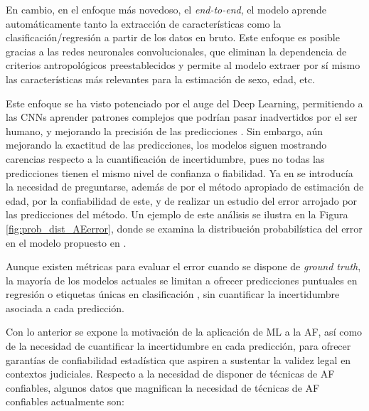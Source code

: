 En cambio, en el enfoque más novedoso, el \textit{end-to-end}, el modelo aprende automáticamente 
tanto la extracción de características como la clasificación/regresión a partir de los datos en bruto. Este enfoque 
es posible gracias a las redes neuronales convolucionales, que eliminan la dependencia de criterios 
antropológicos preestablecidos y permite al modelo extraer por sí mismo las características más relevantes para la
estimación de sexo, edad, etc. 

Este enfoque se ha visto potenciado por el auge del Deep Learning, permitiendo a las CNNs aprender patrones complejos 
que podrían pasar inadvertidos por el ser humano, y mejorando la precisión de las predicciones \cite{stern2019, venema2022}. 
Sin embargo, aún mejorando la exactitud de las predicciones, los modelos siguen mostrando carencias respecto a la 
cuantificación de incertidumbre, pues no todas las predicciones tienen el mismo nivel de confianza o fiabilidad.
Ya en \cite{ferrante2009} se introducía la necesidad de preguntarse, además de por el método apropiado de estimación 
de edad, por la confiabilidad de este, y de realizar un estudio del error arrojado por las predicciones del método.
Un ejemplo de este análisis se ilustra en la Figura \ref{fig:prob_dist_AEerror}, donde se examina la distribución 
probabilística del error en el modelo propuesto en \cite{stepanovsky2024}.


Aunque existen métricas para evaluar el error cuando se dispone de \textit{ground truth}, la mayoría de los modelos 
actuales se limitan a ofrecer predicciones puntuales en regresión \cite{park2024, imaizumi2021, stepanovsky2024} o 
etiquetas únicas en clasificación \cite{venema2022, park2024}, sin cuantificar la incertidumbre asociada a cada predicción.

Con lo anterior se expone la motivación de la aplicación de ML a la AF, así como de la necesidad de cuantificar la
incertidumbre en cada predicción, para ofrecer garantías de confiabilidad estadística que aspiren a sustentar la 
validez legal en contextos judiciales. Respecto a la necesidad de disponer de técnicas de AF confiables, algunos 
datos que magnifican la necesidad de técnicas de AF confiables actualmente son:


